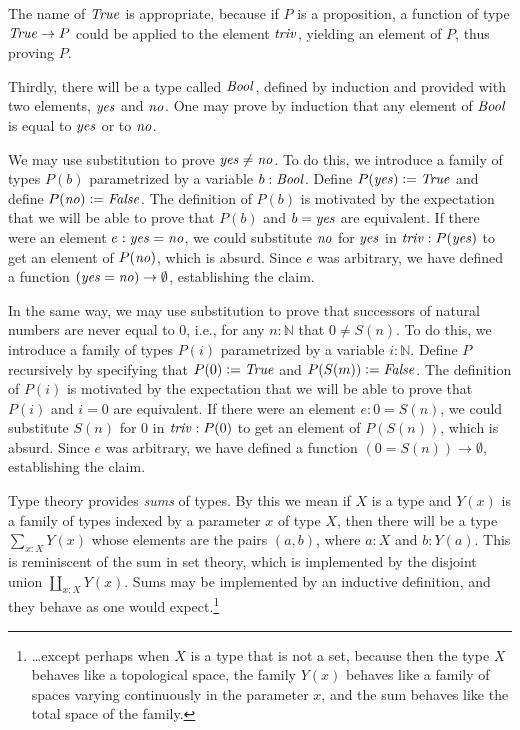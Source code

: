 \documentclass[letter,12pt]{amsart}
\theoremstyle{definition}
\theoremstyle{remark}
\numberwithin{equation}{section}
\newcommand{\bool}{\mathop{{\it Bool}}}
\newcommand{\yes}{\mathop{{\it yes}}}
\newcommand{\no}{\mathop{{\it no}}}
\newcommand{\true}{\mathop{{\it True}}}
\newcommand{\false}{\mathop{{\it False}}}
\newcommand{\triv}{\mathop{{\it triv}}}
\newcommand{\NN}{\mathbb{N}}
\newcommand{\defeq}{\vcentcolon=}
\begin{document}
The name of $\true$ is appropriate, because if $P$ is a proposition, a function of type $\true \to P$ could be applied to the element $\triv$,
yielding an element of $P$, thus proving $P$.

Thirdly, there will be a type called $\bool$, defined by induction and provided with two elements, $\yes$ and $\no$.  One may prove by induction
that any element of $\bool$ is equal to $\yes$ or to $\no$.

We may use substitution to prove $\yes \ne \no$.  To do this, we introduce a family of types $P(b)$ parametrized by a variable $b:\bool$.
Define $P(\yes) \defeq \true$ and define $P(\no) \defeq \false$.  The definition of $P(b)$ is motivated by the expectation that we will be able to prove
that $P(b)$ and $b = \yes$ are equivalent.  If there were an element $e: \yes = \no$, we could substitute $\no$ for $\yes$
in $\triv : P (\yes)$ to get an element of $P(\no)$, which is absurd.  Since $e$ was arbitrary, we have defined a
function $(\yes=\no) \to \emptyset$, establishing the claim.

In the same way, we may use substitution to prove that successors of natural numbers are never equal to $0$, i.e., for any $n:\NN$ that
$0 \ne S(n)$.  To do this, we introduce a family of types $P(i)$ parametrized by a variable $i:\NN$.  
Define $P$ recursively by specifying that $P(0) \defeq \true$ and 
$P(S(m)) \defeq \false$.  The definition of $P(i)$ is motivated by the expectation that we will be able to prove that $P(i)$ and $i = 0$ are
equivalent.  If there were an element $e: 0 = S(n)$, we could substitute $S(n)$ for $0$ in $\triv : P ( 0 )$ to get an element of $P(S(n))$,
which is absurd.  Since $e$ was arbitrary, we have defined a function $(0=S(n)) \to \emptyset$, establishing the claim.

Type theory provides {\em sums} of types.  By this we mean if $X$ is a type and $Y(x)$ is a family of types indexed by a parameter $x$ of
type $X$, then there will be a type $\sum _{x:X} Y(x)$ whose elements are the pairs $(a,b)$, where $a:X$ and $b:Y(a)$.  This is reminiscent of the
sum in set theory, which is implemented by the disjoint union $\amalg _{x:X} Y(x)$.  Sums may be implemented by an inductive definition,
and they behave as one would expect.\footnote{\dots except perhaps when $X$ is a type that is not a set, because then
the type $X$ behaves like a topological space, the family $Y(x)$ behaves like a family of spaces varying continuously in the parameter $x$,
and the sum behaves like the total space of the family.}
\end{document}

